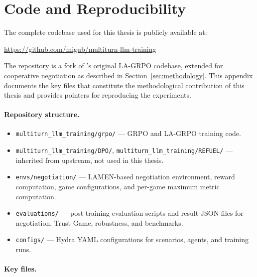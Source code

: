 \documentclass[12pt,a4paper]{article}
\begin{document}
\section{Code and Reproducibility}
\label{app:code}

The complete codebase used for this thesis is publicly available at:
\begin{center}
\url{https://github.com/migub/multiturn-llm-training}
\end{center}

The repository is a fork of \citet{franceschetti2025advantage}'s original LA-GRPO codebase, extended for cooperative negotiation as described in Section~\ref{sec:methodology}. This appendix documents the key files that constitute the methodological contribution of this thesis and provides pointers for reproducing the experiments.

\paragraph{Repository structure.}
\begin{itemize}
    \item \texttt{multiturn\_llm\_training/grpo/} --- GRPO and LA-GRPO training code.
    \item \texttt{multiturn\_llm\_training/DPO/}, \texttt{multiturn\_llm\_training/REFUEL/} --- inherited from upstream, not used in this thesis.
    \item \texttt{envs/negotiation/} --- LAMEN-based negotiation environment, reward computation, game configurations, and per-game maximum metric computation.
    \item \texttt{evaluations/} --- post-training evaluation scripts and result JSON files for negotiation, Trust Game, robustness, and benchmarks.
    \item \texttt{configs/} --- Hydra YAML configurations for scenarios, agents, and training runs.
\end{itemize}

\paragraph{Key files.}
\end{document}
